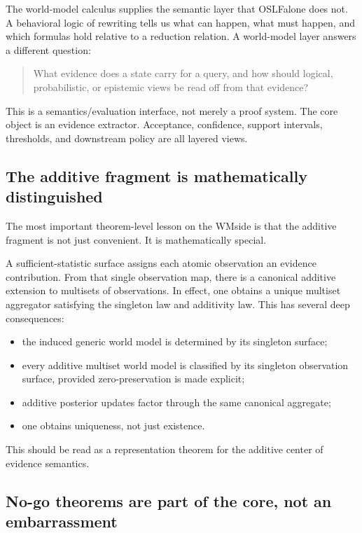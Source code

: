 \documentclass[11pt]{article}
\newcommand{\OSLF}{OSLF}
\newcommand{\WM}{WM}
\begin{document}
The world-model calculus supplies the semantic layer that \OSLF alone does not. A behavioral logic of rewriting tells us what can happen, what must happen, and which formulas hold relative to a reduction relation. A world-model layer answers a different question:

\begin{quote}
What evidence does a state carry for a query, and how should logical, probabilistic, or epistemic views be read off from that evidence?
\end{quote}

This is a semantics/evaluation interface, not merely a proof system. The core object is an evidence extractor. Acceptance, confidence, support intervals, thresholds, and downstream policy are all layered views.

\subsection{The additive fragment is mathematically distinguished}

The most important theorem-level lesson on the \WM side is that the additive fragment is not just convenient. It is mathematically special.

A sufficient-statistic surface assigns each atomic observation an evidence contribution. From that single observation map, there is a canonical additive extension to multisets of observations. In effect, one obtains a unique multiset aggregator satisfying the singleton law and additivity law. This has several deep consequences:

\begin{itemize}
  \item the induced generic world model is determined by its singleton surface;
  \item every additive multiset world model is classified by its singleton observation surface, provided zero-preservation is made explicit;
  \item additive posterior updates factor through the same canonical aggregate;
  \item one obtains uniqueness, not just existence.
\end{itemize}

This should be read as a representation theorem for the additive center of evidence semantics.

\subsection{No-go theorems are part of the core, not an embarrassment}
\end{document}
